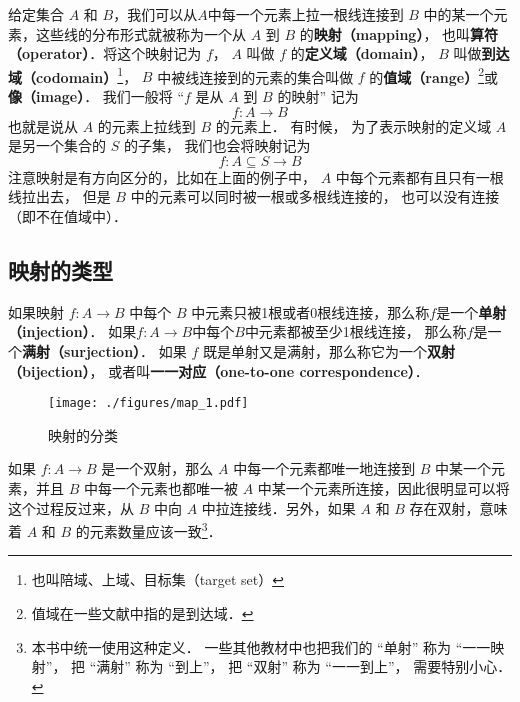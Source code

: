 

给定集合 $A$ 和 $B$，我们可以从$A$中每一个元素上拉一根线连接到 $B$ 中的某一个元素，这些线的分布形式就被称为一个从 $A$ 到 $B$ 的\textbf{映射（mapping）}， 也叫\textbf{算符（operator）}．将这个映射记为 $f$， $A$ 叫做 $f$ 的\textbf{定义域（domain）}， $B$ 叫做\textbf{到达域（codomain）}\footnote{也叫陪域、上域、目标集（target set）}， $B$ 中被线连接到的元素的集合叫做 $f$ 的\textbf{值域（range）}\footnote{值域在一些文献中指的是到达域．}或\textbf{像（image）}． 我们一般将 “$f$ 是从 $A$ 到 $B$ 的映射” 记为
\begin{equation}
f:A\to B
\end{equation}
也就是说从 $A$ 的元素上拉线到 $B$ 的元素上． 有时候， 为了表示映射的定义域 $A$ 是另一个集合的 $S$ 的子集， 我们也会将映射记为
\begin{equation}
f: A\subseteq S \to B
\end{equation}
注意映射是有方向区分的，比如在上面的例子中， $A$ 中每个元素都有且只有一根线拉出去， 但是 $B$ 中的元素可以同时被一根或多根线连接的， 也可以没有连接（即不在值域中）．



\subsection{映射的类型}
\begin{definition}{}\label{map_def1}
如果映射 $f:A \to B$ 中每个 $B$ 中元素只被1根或者0根线连接，那么称$f$是一个\textbf{单射（injection）}． 如果$f:A\to B$中每个$B$中元素都被至少1根线连接， 那么称$f$是一个\textbf{满射（surjection）}． 如果 $f$ 既是单射又是满射，那么称它为一个\textbf{双射（bijection）}， 或者叫\textbf{一一对应（one-to-one correspondence）}．
\end{definition}

\begin{figure}[ht]
\centering
\texttt{[image: ./figures/map\_1.pdf]}
\caption{映射的分类} \label{map_fig1}
\end{figure}

如果 $f:A\to B$ 是一个双射，那么 $A$ 中每一个元素都唯一地连接到 $B$ 中某一个元素，并且 $B$ 中每一个元素也都唯一被 $A$ 中某一个元素所连接，因此很明显可以将这个过程反过来，从 $B$ 中向 $A$ 中拉连接线．另外，如果 $A$ 和 $B$ 存在双射，意味着 $A$ 和 $B$ 的元素数量应该一致\footnote{本书中统一使用这种定义． 一些其他教材中也把我们的 “单射” 称为 “一一映射”， 把 “满射” 称为 “到上”， 把 “双射” 称为 “一一到上”， 需要特别小心．}．

